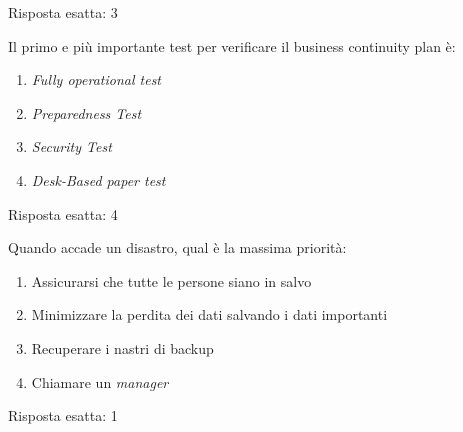 \begin{Answer} [
  ref={bcdr5},
  number={5}
 ]

 \Question Risposta esatta: 3

\end{Answer}


\begin{Exercise} [
  title={Quiz},
  label={bcdr6}
 ]

 \Question Il primo e più importante test per verificare il business
 continuity plan è:
 \begin{enumerate}
   \item \textit{Fully operational test}
   \item \textit{Preparedness Test}
   \item \textit{Security Test}
   \item \textit{Desk-Based paper test}
 \end{enumerate}

\end{Exercise}

\begin{Answer} [
  ref={bcdr6},
  number={6}
 ]

 \Question Risposta esatta: 4

\end{Answer}


\begin{Exercise} [
  title={Quiz},
  label={bcdr7}
 ]

 \Question Quando accade un disastro, qual è la massima priorità:
 \begin{enumerate}
   \item Assicurarsi che tutte le persone siano in salvo
   \item Minimizzare la perdita dei dati salvando i dati importanti
   \item Recuperare i nastri di backup
   \item Chiamare un \textit{manager}
 \end{enumerate}

\end{Exercise}

\begin{Answer} [
  ref={bcdr7},
  number={7}
 ]

 \Question Risposta esatta: 1

\end{Answer}

